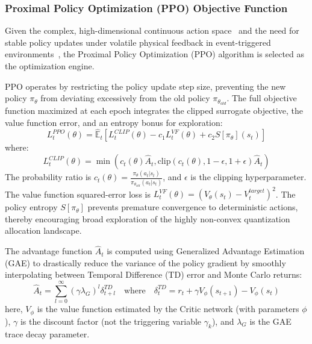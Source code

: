 \subsubsection{Proximal Policy Optimization (PPO) Objective Function}
Given the complex, high-dimensional continuous action space~\cite{CCDRL} and the need for stable policy updates under volatile physical feedback in event-triggered environments~\cite{ETDRL}, the Proximal Policy Optimization (PPO) algorithm is selected as the optimization engine. 

PPO operates by restricting the policy update step size, preventing the new policy $\pi_\theta$ from deviating excessively from the old policy $\pi_{\theta_{old}}$. The full objective function maximized at each epoch integrates the clipped surrogate objective, the value function error, and an entropy bonus for exploration:
\begin{equation}
    L_t^{PPO}(\theta) = \hat{\mathbb{E}}_t \left[ L_t^{CLIP}(\theta) - c_1 L_t^{VF}(\theta) + c_2 S[\pi_\theta](s_t) \right]
\end{equation}
where:
\begin{equation}
    L_t^{CLIP}(\theta) = \min\left( c_t(\theta)\hat{A}_t, \text{clip}(c_t(\theta), 1-\epsilon, 1+\epsilon)\hat{A}_t \right)
\end{equation}
The probability ratio is $c_t(\theta) = \frac{\pi_\theta(a_t|s_t)}{\pi_{\theta_{old}}(a_t|s_t)}$, and $\epsilon$ is the clipping hyperparameter. The value function squared-error loss is $L_t^{VF}(\theta) = (V_\theta(s_t) - V_t^{target})^2$. The policy entropy $S[\pi_\theta]$ prevents premature convergence to deterministic actions, thereby encouraging broad exploration of the highly non-convex quantization allocation landscape.

The advantage function $\hat{A}_t$ is computed using Generalized Advantage Estimation (GAE) to drastically reduce the variance of the policy gradient by smoothly interpolating between Temporal Difference (TD) error and Monte Carlo returns:
\begin{equation}
    \hat{A}_t = \sum_{l=0}^{\infty} (\gamma \lambda_G)^l \delta_{t+l}^{TD} \quad \text{where} \quad \delta_t^{TD} = r_t + \gamma V_\phi(s_{t+1}) - V_\phi(s_t)
\end{equation}
here, $V_\phi$ is the value function estimated by the Critic network (with parameters $\phi$), $\gamma$ is the discount factor (not the triggering variable $\gamma_k$), and $\lambda_G$ is the GAE trace decay parameter. 

